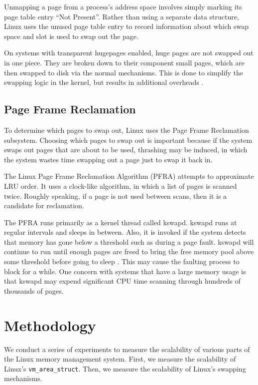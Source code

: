 \documentclass[twocolumn,11pt]{article}
\begin{document}
Unmapping a page from a process's address space involves simply marking its page
table entry ``Not Present''. Rather than using a separate data structure, Linux
uses the unused page table entry to record information about which swap space
and slot is used to swap out the page.

On systems with transparent hugepages enabled, huge pages are not swapped out in
one piece.  They are broken down to their component small pages, which are then
swapped to disk via the normal mechanisms. This is done to simplify the swapping
logic in the kernel, but results in additional overheads
\cite{corbet_transparent}.

\subsection{Page Frame Reclamation}

To determine which pages to swap out, Linux uses the Page Frame Reclamation
subsystem. Choosing which pages to swap out is important because if the system
swaps out pages that are about to be used, thrashing may be induced, in which
the system wastes time swapping out a page just to swap it back in.

The Linux Page Frame Reclamation Algorithm (PFRA) attempts to approximate LRU
order. It uses a clock-like algorithm, in which a list of pages is scanned
twice. Roughly speaking, if a page is not used between scans, then it is a
candidate for reclamation.

The PFRA runs primarily as a kernel thread called kswapd. kswapd runs at
regular intervals and sleeps in between. Also, it is invoked if the system
detects that memory has gone below a threshold such as during a page fault.
kswapd will continue to run until enough pages are freed to bring the free
memory pool above some threshold before going to sleep \cite{utlk}.  This may
cause the faulting process to block for a while. One concern with systems that
have a large memory usage is that kswapd may expend significant CPU time
scanning through hundreds of thousands of pages.

\section{Methodology}

We conduct a series of experiments to measure the scalability of various parts
of the Linux memory management system.  First, we measure the scalability of
Linux's \texttt{vm\_area\_struct}. Then, we measure the scalability of Linux's
swapping mechanisms.
\end{document}
